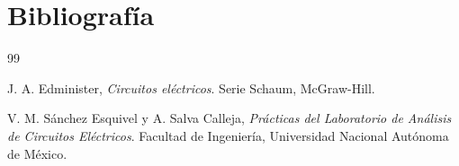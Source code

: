 \newpage
\section*{Bibliografía}

\begin{thebibliography}{99}
	
	J. A. Edminister, \textit{Circuitos eléctricos}. Serie Schaum, McGraw-Hill.
	
	V. M. Sánchez Esquivel y A. Salva Calleja, \textit{Prácticas del Laboratorio de Análisis de Circuitos Eléctricos}. Facultad de Ingeniería, Universidad Nacional Autónoma de México.
	
\end{thebibliography}